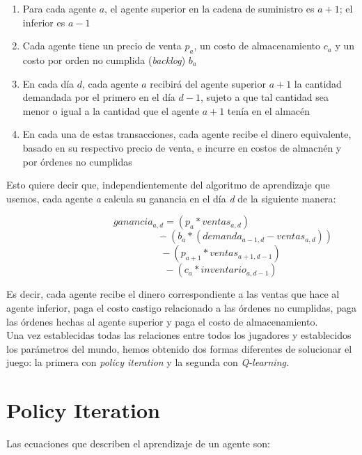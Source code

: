 \begin{enumerate}
    \item Para cada agente \textit{$a$}, el agente superior en la cadena de suministro es \textit{$a+1$}; el inferior es \textit{$a-1$}
    \item Cada agente tiene un precio de venta \textit{$p_{a}$}, un costo de almacenamiento \textit{$c_{a}$} y un costo por orden no cumplida (\textit{backlog}) \textit{$b_{a}$}
    \item En cada d\'ia \textit{$d$}, cada agente \textit{$a$} recibir\'a del agente superior \textit{$a+1$} la cantidad demandada por el primero en el d\'ia \textit{$d-1$}, sujeto a que tal cantidad sea menor o igual a la cantidad que el agente \textit{$a+1$} ten\'ia en el almac\'en
    \item En cada una de estas transacciones, cada agente recibe el dinero equivalente, basado en su respectivo precio de venta, e incurre en costos de almacn\'en y por \'ordenes no cumplidas
\end{enumerate}


Esto quiere decir que, independientemente del algoritmo de aprendizaje que usemos, cada agente \textit{a} calcula su ganancia en el d\'ia \textit{d} de la siguiente manera:

$$
ganancia_{a,d} = (p_{a} * ventas_{a, d}) 
$$
$$
\quad  \quad  \quad  \quad  \quad  \quad  \quad  \quad  \quad \quad  \quad   \quad  \quad - (b_{a}* (demanda_{a-1,d} - ventas_{a,d})) 
$$
$$
\quad  \quad  \quad  \quad  \quad  \quad  \quad  \quad - (p_{a+1}*ventas_{a+1, d-1})
$$
$$
\quad  \quad  \quad  \quad  \quad  \quad  \quad  \quad - (c_{a}*inventario_{a,d-1})
$$

Es decir, cada agente recibe el dinero correspondiente a las ventas que hace al agente inferior, paga el costo castigo relacionado a las \'ordenes no cumplidas, paga las \'ordenes hechas al agente superior y paga el costo de almacenamiento.\\

Una vez establecidas todas las relaciones entre todos los jugadores y establecidos los par\'ametros del mundo, hemos obtenido dos formas diferentes de solucionar el juego: la primera con \textit{policy iteration} y la segunda con \textit{Q-learning}.

\section{Policy Iteration}

Las ecuaciones que describen el aprendizaje de un agente son:

